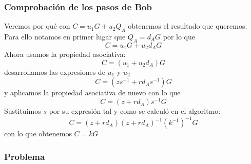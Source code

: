 \documentclass[xcolor=x11names,compress,utf8]{beamer}
\begin{document}
\begin{frame}\frametitle{Comprobación de los pasos de Bob}
Veremos por qué con $C=u_1G+u_2Q_A$ obtenemos el resultado que queremos. Para ello notamos en primer lugar que $Q_A=d_AG$ por lo que
$$C=u_1G+u_2d_AG$$
Ahora usamos la propiedad asociativa:
$$C = (u_1+u_2d_A)G$$
desarrollamos las expresiones de $u_1$ y $u_2$
$$C = (zs^{-1}+rd_As^{-1})G$$
y aplicamos la propiedad asociativa de nuevo con lo que
$$C = (z+rd_A)s^{-1}G$$
Sustituimos $s$ por su expresión tal y como se calculó en el
algoritmo:
$$C = (z+rd_A)(z+rd_A)^{-1}(k^{-1})^{-1}G$$
con lo que obtenemos $C = kG$
\end{frame}

\begin{frame}\frametitle{Problema}
\end{frame}

\begin{frame}\frametitle{}
\end{frame}
\end{document}
